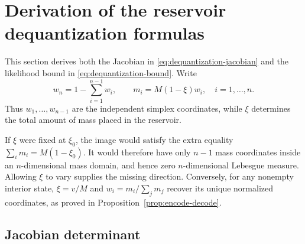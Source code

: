 \documentclass[10pt]{article}
\theoremstyle{definition}
\theoremstyle{remark}
\begin{document}
\appendix

\section{Derivation of the reservoir dequantization formulas}
\label{app:dequantization-derivation}

This section derives both the Jacobian in
\eqref{eq:dequantization-jacobian} and the likelihood bound in
\eqref{eq:dequantization-bound}.  Write
\begin{equation}
  w_n=1-\sum_{i=1}^{n-1}w_i,
  \qquad
  m_i=M(1-\xi)w_i,
  \quad i=1,\ldots,n.
  \label{eq:appendix-dequantization-map}
\end{equation}
Thus $w_1,\ldots,w_{n-1}$ are the independent simplex coordinates, while
$\xi$ determines the total amount of mass placed in the reservoir.

If $\xi$ were fixed at $\xi_0$, the image would satisfy the extra equality
$\sum_i m_i=M(1-\xi_0)$.  It would therefore have only $n-1$ mass
coordinates inside an $n$-dimensional mass domain, and hence zero
$n$-dimensional Lebesgue measure.  Allowing $\xi$ to vary supplies the
missing direction.  Conversely, for any nonempty interior state,
$\xi=v/M$ and $w_i=m_i/\sum_jm_j$ recover its unique normalized coordinates,
as proved in Proposition~\ref{prop:encode-decode}.

\subsection{Jacobian determinant}
\end{document}
